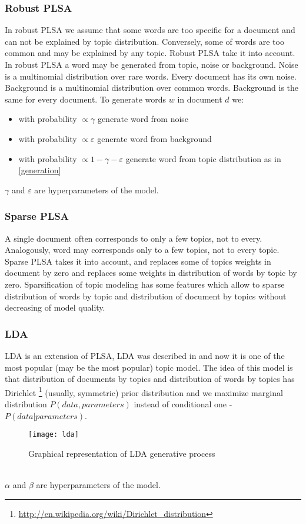     \subsubsection{Robust PLSA}
	In robust PLSA we assume that some words are too specific for a document and can not be explained by topic
	distribution. Conversely, some of words are too common and may be explained by any topic.
	Robust PLSA take it into account. In robust PLSA a word may be generated from topic, noise or background.
	Noise is a multinomial distribution over rare words. Every document has its own noise.
	Background is a multinomial distribution over common words. Background is the same for every document.
	To generate words $w$  in document $d$ we:
	\begin{itemize}
	    \item with probability $\propto \gamma$ generate word from noise
	    \item with probability $\propto \varepsilon$ generate word from background
	    \item with probability $\propto 1 - \gamma - \varepsilon$ generate word from topic
		distribution as in \ref{generation}
	\end{itemize}
	$\gamma$ and $\varepsilon$ are hyperparameters of the model.

    \subsubsection{Sparse PLSA} \label{sparseModel} 
	A single document often corresponds to only a few topics, not to every. Analogously,
	word may corresponds only to a few topics, not to every topic. Sparse PLSA takes it into account,
	and replaces some of topics weights in document by zero and replaces some weights in distribution
	of words by topic by zero. Sparsification of topic modeling has some features which allow to sparse distribution of
	words by topic and distribution of document by topics without decreasing of model quality.

    \subsubsection{LDA} \label{LDA}
	LDA is an extension of PLSA, LDA was described in \cite{LDA} and now it is one of the most popular (may be the most popular) topic model. The idea of this model is that
	distribution of documents by topics and distribution of words by topics has Dirichlet \footnote{\url{http://en.wikipedia.org/wiki/Dirichlet_distribution}} (usually, symmetric) prior distribution and we maximize marginal distribution $P(data, parameters)$ instead of conditional one \-- $P(data | parameters)$. 
	\begin{figure}[!ht]
	\caption{Graphical representation of LDA generative process}
	\begin{minipage}{\textwidth}
	    \texttt{[image: lda]}
	\end{minipage}
	\end{figure}\\
	$\alpha$ and $\beta$ are hyperparameters of the model. 
 
